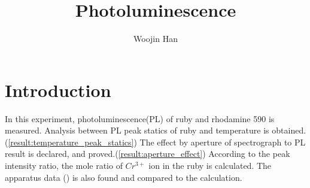 \documentclass{article}
\begin{document}
\title{Photoluminescence}
\author[1]{Woojin Han}
\maketitle
\begin{abstract}

\end{abstract}

\section{Introduction}
 In this experiment, photoluminescence(PL) of ruby and rhodamine 590 is measured.
 Analysis between PL peak statics of ruby and temperature is obtained.(\ref{result:temperature_peak_statics})
 The effect by aperture of spectrograph to PL result is declared, and proved.(\ref{result:aperture_effect})
 According to the peak intensity ratio, the mole ratio of $Cr^{3+}$ ion in the ruby is calculated.
 The apparatus data (\cite{ruby_spec}) is also found and compared to the calculation.
\end{document}
